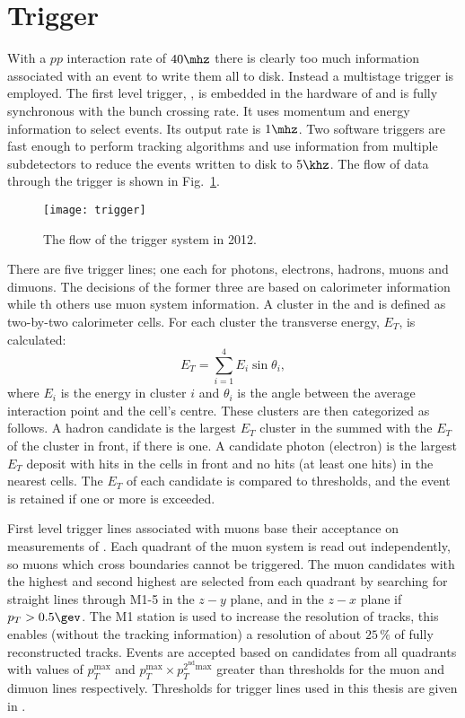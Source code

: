 \section{Trigger}

With a $pp$ interaction rate of $40\mhz$ there is clearly too much information associated with an event
to write them all to disk.
Instead a multistage trigger is employed.
The first level trigger, \lone, is embedded in the hardware of \lhcb and is fully synchronous with
the bunch crossing rate.
It uses momentum and energy information to select events.
Its output rate is $1\mhz$.
Two software triggers are fast enough to perform tracking algorithms and use information from
multiple subdetectors to reduce the events written to disk to $5\khz$.
The flow of data through the trigger is shown in Fig.~\ref{fig:lhcb:trigger}.

\begin{figure}
  \begin{center}
    \texttt{[image: trigger]}
  \end{center}
  \caption[Trigger sequence]
  {\small
    The flow of the \lhcb trigger system in 2012.
  }
  \label{fig:lhcb:trigger}
\end{figure}

There are five \lone trigger lines; one each for photons, electrons, hadrons, muons and dimuons.
The decisions of the former three are based on calorimeter information while th others use muon
system information.
A cluster in the \ecal and \hcal is defined as two-by-two calorimeter cells.
For each cluster the transverse energy, $E_T$, is calculated:
\begin{equation}
  E_T = \sum_{i=1}^4E_i\sin\theta_i,
\end{equation}
where $E_i$ is the energy in cluster $i$ and $\theta_i$ is the angle between the average
interaction point and the cell's centre.
These clusters are then categorized as follows.
A hadron candidate is the largest $E_T$ cluster in the \hcal summed with the $E_T$ of the \ecal
cluster in front, if there is one.
A candidate photon (electron) is the largest $E_T$ deposit with hits in the \presh cells in front and
no hits (at least one hits) in the nearest \spd cells.
The $E_T$ of each candidate is compared to thresholds, and the event is retained if one or more is
exceeded.

First level trigger lines associated with muons base their acceptance on measurements of \pt.
Each quadrant of the muon system is read out independently, so muons which cross boundaries cannot
be triggered.
The muon candidates with the highest and second highest \pt are selected from each quadrant by
searching for straight lines through M1-5 in the $z-y$ plane, and in the $z-x$ plane if
$p_T>0.5\gev$.
The M1 station is used to increase the \pt resolution of tracks, this enables (without the
tracking information) a resolution of about $25\,\%$ of fully reconstructed tracks.
Events are accepted based on candidates from all quadrants with values of $p_T^\mathrm{max}$ and
$p_T^\mathrm{max}\times p_T^\mathrm{2^{nd} max}$ greater than thresholds for the muon and dimuon
lines respectively.
Thresholds for \lone trigger lines used in this thesis are given in .

